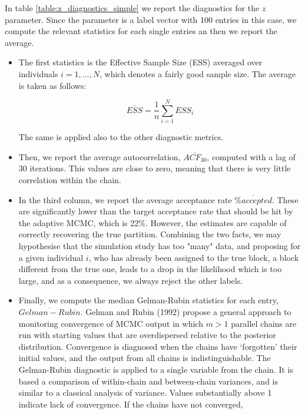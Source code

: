 \documentclass[11pt]{amsart}
\begin{document}
In table \eqref{table:z_diagnostics_simple} we report the diagnostics for the $z$ parameter. Since the parameter is a label vector with 100 entries in this case, we compute the relevant statistics for each single entries an then we report the average.
\begin{itemize}

\item The first statistics is the Effective Sample Size (ESS) averaged over individuals $i=1,\dots,N$, which denotes a fairly good sample size. The average is taken as follows:

$$
\overline{ESS} = \frac{1}{n} \sum_{i=1}^N ESS_i
$$

The same is applied also to the other diagnostic metrics.

\item Then, we report the average autocorrelation, $\overline{ACF_{30}}$, computed with a lag of 30 iterations. This values are close to zero, meaning that there is very little correlation within the chain.

\item In the third column, we report the average acceptance rate $\overline{\% accepted}$. These are significantly lower than the target acceptance rate that should be hit by the adaptive MCMC, which is 22\%. However, the estimates are capable of correctly recovering the true partition. Combining the two facts, we may hypothesise that the simulation study has too "many" data, and proposing for a given individual $i$, who has already been assigned to the true block, a block different from the true one, leads to a drop in the likelihood which is too large, and as a consequence, we always reject the other labels. 

\item Finally, we compute the median Gelman-Rubin statistics for each entry, $\overline{Gelman-Rubin}$. Gelman and Rubin (1992) propose a general approach to monitoring convergence of MCMC output in which $m >1$ parallel chains are run with starting values that are overdispersed relative to the posterior distribution. Convergence is diagnosed when the chains have ‘forgotten’ their initial values, and the output from all chains is indistinguishable. The Gelman-Rubin diagnostic is applied to a single variable from the chain. It is based a comparison of within-chain and between-chain variances, and is similar to a classical analysis of variance. Values substantially above 1 indicate lack of convergence. If the chains have not converged,
\end{itemize}
\end{document}
